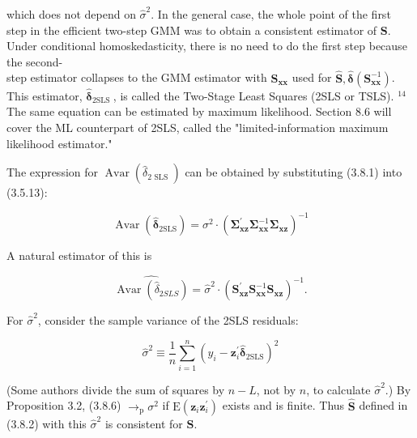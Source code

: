 \documentclass[10pt]{article}
\begin{document}
which does not depend on $\hat{\sigma}^{2}$. In the general case, the whole point of the first step in the efficient two-step GMM was to obtain a consistent estimator of $\mathbf{S}$. Under conditional homoskedasticity, there is no need to do the first step because the second-\\
step estimator collapses to the GMM estimator with $\mathbf{S}_{\mathbf{x x}}$ used for $\widehat{\mathbf{S}}, \hat{\boldsymbol{\delta}}\left(\mathbf{S}_{\mathbf{x x}}^{-1}\right)$. This estimator, $\hat{\boldsymbol{\delta}}_{\text {2SLS }}$, is called the Two-Stage Least Squares (2SLS or TSLS). ${ }^{14}$ The same equation can be estimated by maximum likelihood. Section 8.6 will cover the ML counterpart of 2SLS, called the "limited-information maximum likelihood estimator."

The expression for $\operatorname{Avar}\left(\hat{\delta}_{2 \text { SLS }}\right)$ can be obtained by substituting (3.8.1) into (3.5.13):


\begin{equation*}
\operatorname{Avar}\left(\hat{\boldsymbol{\delta}}_{2 \mathrm{SLS}}\right)=\sigma^{2} \cdot\left(\boldsymbol{\Sigma}_{\mathbf{x z}}^{\prime} \boldsymbol{\Sigma}_{\mathbf{x x}}^{-1} \boldsymbol{\Sigma}_{\mathbf{x z}}\right)^{-1} \tag{3.8.4}
\end{equation*}


A natural estimator of this is


\begin{equation*}
\widehat{\operatorname{Avar}\left(\hat{\delta}_{2 S L S}\right)}=\hat{\sigma}^{2} \cdot\left(\mathbf{S}_{\mathbf{x z}}^{\prime} \mathbf{S}_{\mathbf{x x}}^{-1} \mathbf{S}_{\mathbf{x z}}\right)^{-1} . \tag{3.8.5}
\end{equation*}


For $\hat{\sigma}^{2}$, consider the sample variance of the 2SLS residuals:


\begin{equation*}
\hat{\sigma}^{2} \equiv \frac{1}{n} \sum_{i=1}^{n}\left(y_{i}-\mathbf{z}_{i}^{\prime} \hat{\boldsymbol{\delta}}_{2 \mathrm{SLS}}\right)^{2} \tag{3.8.6}
\end{equation*}


(Some authors divide the sum of squares by $n-L$, not by $n$, to calculate $\hat{\sigma}^{2}$.) By Proposition 3.2, (3.8.6) $\rightarrow_{\mathrm{p}} \sigma^{2}$ if $\mathrm{E}\left(\mathbf{z}_{i} \mathbf{z}_{i}^{\prime}\right)$ exists and is finite. Thus $\widehat{\mathbf{S}}$ defined in (3.8.2) with this $\hat{\sigma}^{2}$ is consistent for $\mathbf{S}$.
\end{document}
